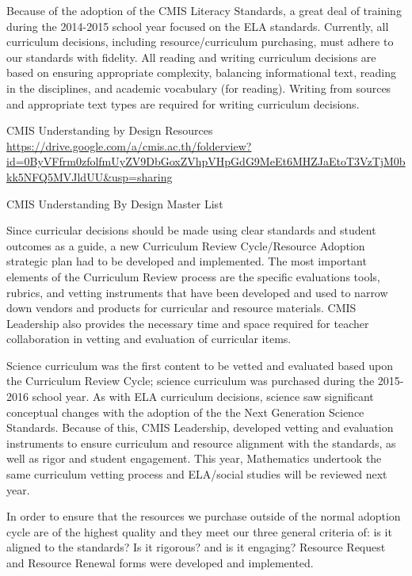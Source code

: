 \documentclass{report}
\begin{document}
\begin{findings}
Because of the adoption of the CMIS Literacy Standards, a great deal of training during the 2014-2015 school year focused on the ELA standards. Currently, all curriculum decisions, including resource/curriculum purchasing, must adhere to our standards with fidelity. All reading and writing curriculum decisions are based on ensuring appropriate complexity, balancing informational text, reading in the disciplines, and academic vocabulary (for reading). Writing from sources and appropriate text types are required for writing curriculum decisions. 
\end{findings}

\begin{evidence}
\item CMIS Understanding by Design Resources \url{https://drive.google.com/a/cmis.ac.th/folderview?id=0ByVFfrm0zfolfmUyZV9DbGoxZVhpVHpGdG9MeEt6MHZJaEtoT3VzTjM0bkk5NFQ5MVJldUU&usp=sharing}
\item CMIS Understanding By Design Master List
\end{evidence}

\begin{findings}

Since curricular decisions should be made using clear standards and student outcomes as a guide, a new Curriculum Review Cycle/Resource Adoption strategic plan had to be developed and implemented. The most important elements of the Curriculum Review process are the specific evaluations tools, rubrics, and vetting instruments that have been developed and used to narrow down vendors and products for curricular and resource materials. CMIS Leadership also provides the necessary time and space required for teacher collaboration in vetting and evaluation of curricular items. 

Science curriculum was the first content to be vetted and evaluated based upon the Curriculum Review Cycle; science curriculum was purchased during the 2015-2016 school year. As with ELA curriculum decisions, science saw significant conceptual changes with the adoption of the the Next Generation Science Standards. Because of this, CMIS Leadership, developed vetting and evaluation instruments to ensure curriculum and resource alignment with the standards, as well as rigor and student engagement. This year, Mathematics undertook the same curriculum vetting process and ELA/social studies will be reviewed next year. 

In order to ensure that the resources we purchase outside of the normal adoption cycle are of the highest quality and they meet our three general criteria of: is it aligned to the standards? Is it rigorous? and is it engaging? Resource Request and Resource Renewal forms were developed and implemented. 
\end{findings}
\end{document}

